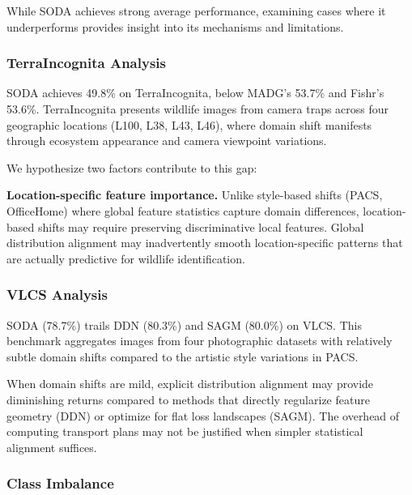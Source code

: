 While SODA achieves strong average performance, examining cases where it underperforms provides insight into its mechanisms and limitations.

\subsubsection{TerraIncognita Analysis}

SODA achieves 49.8\% on TerraIncognita, below MADG's 53.7\% and Fishr's 53.6\%. TerraIncognita presents wildlife images from camera traps across four geographic locations (L100, L38, L43, L46), where domain shift manifests through ecosystem appearance and camera viewpoint variations.

We hypothesize two factors contribute to this gap:
\begin{sloppypar} 
\textbf{Location-specific feature importance.} Unlike style-based shifts (PACS, OfficeHome) where global feature statistics capture domain differences, location-based shifts may require preserving discriminative local features. Global distribution alignment may inadvertently smooth location-specific patterns that are actually predictive for wildlife identification.
\end{sloppypar} 
\subsubsection{VLCS Analysis}

SODA (78.7\%) trails DDN (80.3\%) and SAGM (80.0\%) on VLCS. This benchmark aggregates images from four photographic datasets with relatively subtle domain shifts compared to the artistic style variations in PACS.

When domain shifts are mild, explicit distribution alignment may provide diminishing returns compared to methods that directly regularize feature geometry (DDN) or optimize for flat loss landscapes (SAGM). The overhead of computing transport plans may not be justified when simpler statistical alignment suffices.

\subsubsection{Class Imbalance}

